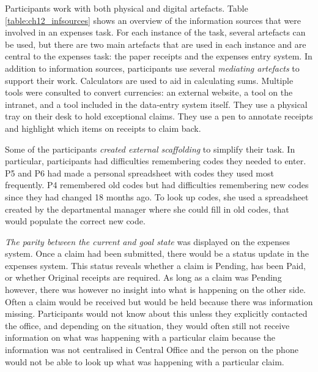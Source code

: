 
Participants work with both physical and digital artefacts. Table \ref{table:ch12_infsources} shows an overview of the information sources that were involved in an expenses task. For each instance of the task, several artefacts can be used, but there are two main artefacts that are used in each instance and are central to the expenses task: the paper receipts and the expenses entry system.
In addition to information sources, participants use several \textit{mediating artefacts} to support their work. Calculators are used to aid in calculating sums. Multiple tools were consulted to convert currencies: an external website, a tool on the intranet, and a tool included in the data-entry system itself. They use a physical tray on their desk to hold exceptional claims. They use a pen to annotate receipts and highlight which items on receipts to claim back.

Some of the participants \textit{created external scaffolding} to simplify their task. In particular, participants had difficulties remembering codes they needed to enter. P5 and P6 had made a personal spreadsheet with codes they used most frequently. P4 remembered old codes but had difficulties remembering new codes since they had changed 18 months ago. To look up codes, she used a spreadsheet created by the departmental manager where she could fill in old codes, that would populate the correct new code. 

\textit{The parity between the current and goal state} was displayed on the expenses system. Once a claim had been submitted, there would be a status update in the expenses system. This status reveals whether a claim is Pending, has been Paid, or whether Original receipts are required. As long as a claim was Pending however, there was however no insight into what is happening on the other side. Often a claim would be received but would be held because there was information missing. Participants would not know about this unless they explicitly contacted the office, and depending on the situation, they would often still not receive information on what was happening with a particular claim because the information was not centralised in Central Office and the person on the phone would not be able to look up what was happening with a particular claim.

